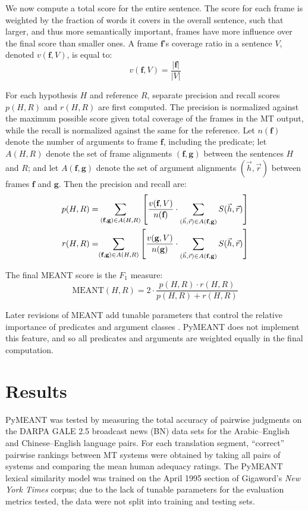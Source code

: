 \documentclass[11pt,twocolumn]{article}
\begin{document}
We now compute a total score for the entire sentence.
The score for each frame is weighted by the fraction of words it covers
in the overall sentence, such that larger, and thus more semantically
important, frames have more influence over the final score than smaller
ones.
A frame $\mathbf{f}$'s coverage ratio in a sentence $V$, denoted
$v(\mathbf{f},V)$, is equal to:
\[
v(\mathbf{f},V) = \frac{|\mathbf{f}|}{|V|}
\]

For each hypothesis $H$ and reference $R$, separate precision and recall
scores $p(H,R)$ and $r(H,R)$ are first computed.
The precision is normalized against the maximum possible score given
total coverage of the frames in the MT output, while the recall is
normalized against the same for the reference.
Let $n(\textbf{f})$ denote the number of arguments to frame
$\textbf{f}$, including the predicate; let $A(H,R)$ denote the set of
frame alignments $(\textbf{f},\textbf{g})$ between the sentences $H$ and
$R$; and let $A(\textbf{f},\textbf{g})$ denote the set of argument
alignments $(\vec h,\vec r)$ between frames $\textbf{f}$ and
$\textbf{g}$.
Then the precision and recall are:
\begin{align*}
p(H,R)&=&\hspace{-10pt}\sum_{(\textbf{f},\textbf{g})\in A(H,R)}
\left[
\frac{v(\textbf{f},V)}{n(\textbf{f})}\cdot
\sum_{(\vec h,\vec r)\in A(\textbf{f},\textbf{g})} S(\vec h,\vec r)
\right] \\
r(H,R)&=&\hspace{-10pt}\sum_{(\textbf{f},\textbf{g})\in A(H,R)}
\left[
\frac{v(\textbf{g},V)}{n(\textbf{g})}\cdot
\sum_{(\vec h,\vec r)\in A(\textbf{f},\textbf{g})} S(\vec h,\vec r)
\right]
\end{align*}

The final MEANT score is the $F_1$ measure:
\[
\textrm{MEANT}(H,R)=2\cdot\frac
{p(H,R)\cdot r(H,R)}
{p(H,R)+r(H,R)}
\]

Later revisions of MEANT add tunable parameters that control the
relative importance of predicates and argument classes \cite{Lo:2013}.
PyMEANT does not implement this feature, and so all predicates and
arguments are weighted equally in the final computation.


\section{Results}

PyMEANT was tested by measuring the total accuracy of pairwise
judgments on the DARPA GALE 2.5 broadcast news (BN) data sets for the
Arabic--English and Chinese--English language pairs.
For each translation segment, ``correct'' pairwise rankings between MT
systems were obtained by taking all pairs of systems and comparing the
mean human adequacy ratings.
The PyMEANT lexical similarity model was trained on the April 1995
section of Gigaword's \textit{New York Times} corpus;
due to the lack of tunable parameters for the evaluation metrics tested,
the data were not split into training and testing sets.
\end{document}

